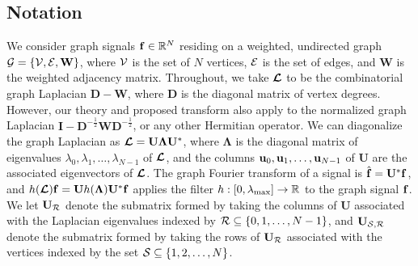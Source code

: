 \documentclass[journal, 10pt]{IEEEtran}
\begin{document}
\subsection{Notation}
We consider graph signals ${\bf f} \in \mathbb{R}^N$ residing on a weighted, undirected graph ${\mathcal{G}}=\{{\mathcal{V}},{\mathcal{E}},\mathbf{W}\}$, where ${\mathcal{V}}$ is the set of $N$ vertices, ${\mathcal{E}}$ is the set of edges, and $\mathbf{W}$ is the weighted adjacency matrix. 
Throughout, we take $\boldsymbol{\mathcal{L}}$ to be the combinatorial graph Laplacian $\mathbf{D}-\mathbf{W}$, where $\mathbf{D}$ is the diagonal matrix of vertex degrees. However, our theory and proposed transform also apply to the normalized graph Laplacian $\mathbf{I}-\mathbf{D}^{-\frac{1}{2}}\mathbf{W}\mathbf{D}^{-\frac{1}{2}}$, or any other Hermitian operator. We can diagonalize the graph Laplacian as $\boldsymbol{\mathcal{L}}=\mathbf{U}{\boldsymbol \Lambda}\mathbf{U}^{*}$, where ${\boldsymbol \Lambda}$ is the diagonal matrix of eigenvalues $\lambda_0,\lambda_1,\ldots,\lambda_{N-1}$ of $\boldsymbol{\mathcal{L}}$, and the columns ${\bf u}_0,{\bf u}_1,\ldots,{\bf u}_{N-1}$ of $\mathbf{U}$ are the associated eigenvectors of $\boldsymbol{\mathcal{L}}$. The graph Fourier transform of a signal is $\hat{\bf{f}}=\mathbf{U}^{*}{\bf f}$, and ${h}(\boldsymbol{\mathcal{L}}){\bf f}=\mathbf{U}{h}({\boldsymbol \Lambda})\mathbf{U}^{*}{\bf f}$ applies the filter ${h}: [0,\lambda_{\max}] \rightarrow \mathbb{R}$ to the graph signal ${\bf f}$. We %
let $\mathbf{U}_{{\cal R}}$ %
denote the submatrix formed by taking the columns of $\mathbf{U}$ associated with the Laplacian eigenvalues indexed by ${\cal R} \subseteq \{0,1,\ldots,N-1\}$, %
and %
$\mathbf{U}_{{\cal S},{\cal R}}$ %
denote the submatrix  formed by taking the rows of $\mathbf{U}_{{\cal R}}$ associated with the vertices indexed by the set ${\cal S} \subseteq \{1,2,\ldots,N\}$.
\end{document}
